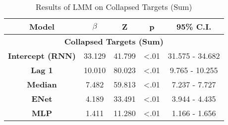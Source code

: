 \begin{table}[h]
\centering
\caption{Results of LMM on Collapsed Targets (Sum)}
\label{collapsed_lmm_33}
\begin{tabular}{ccccc}
\hline
\textbf{Model}           & \textbf{$\beta$} & \textbf{Z} & \textbf{p} & \textbf{95\% C.I.} \\ \hline
\multicolumn{5}{c}{\textbf{Collapsed Targets (Sum)}}                                                 \\ \hline
\textbf{Intercept (RNN)} & 33.129                & 41.799     & \textless .01   & 31.575 - 34.682      \\
\textbf{Lag 1}           & 10.010                 & 80.023     & \textless .01   & 9.765 - 10.255        \\
\textbf{Median}          & 7.482                 & 59.813     & \textless .01   & 7.237 - 7.727        \\
\textbf{ENet}            & 4.189                 & 33.491     & \textless .01   & 3.944 - 4.435        \\
\textbf{MLP}             & 1.411                 & 11.280     & \textless .01   & 1.166 - 1.656        \\ \hline
\end{tabular}
\end{table}